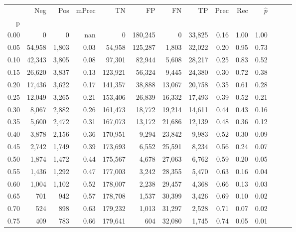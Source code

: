 \begin{tabular}{rrrrrrrrrrrrrr}
\toprule
{} &     Neg &    Pos & mPrec &       TN &       FP &      FN &      TP &  Prec &   Rec & $\hat{p}$ \\
p    &         &        &       &          &          &         &         &       &       &           \\
\midrule
0.00 &       0 &      0 &   nan &        0 &  180,245 &       0 &  33,825 &  0.16 &  1.00 &      1.00 \\
0.05 &  54,958 &  1,803 &  0.03 &   54,958 &  125,287 &   1,803 &  32,022 &  0.20 &  0.95 &      0.73 \\
0.10 &  42,343 &  3,805 &  0.08 &   97,301 &   82,944 &   5,608 &  28,217 &  0.25 &  0.83 &      0.52 \\
0.15 &  26,620 &  3,837 &  0.13 &  123,921 &   56,324 &   9,445 &  24,380 &  0.30 &  0.72 &      0.38 \\
0.20 &  17,436 &  3,622 &  0.17 &  141,357 &   38,888 &  13,067 &  20,758 &  0.35 &  0.61 &      0.28 \\
0.25 &  12,049 &  3,265 &  0.21 &  153,406 &   26,839 &  16,332 &  17,493 &  0.39 &  0.52 &      0.21 \\
0.30 &   8,067 &  2,882 &  0.26 &  161,473 &   18,772 &  19,214 &  14,611 &  0.44 &  0.43 &      0.16 \\
0.35 &   5,600 &  2,472 &  0.31 &  167,073 &   13,172 &  21,686 &  12,139 &  0.48 &  0.36 &      0.12 \\
0.40 &   3,878 &  2,156 &  0.36 &  170,951 &    9,294 &  23,842 &   9,983 &  0.52 &  0.30 &      0.09 \\
0.45 &   2,742 &  1,749 &  0.39 &  173,693 &    6,552 &  25,591 &   8,234 &  0.56 &  0.24 &      0.07 \\
0.50 &   1,874 &  1,472 &  0.44 &  175,567 &    4,678 &  27,063 &   6,762 &  0.59 &  0.20 &      0.05 \\
0.55 &   1,436 &  1,292 &  0.47 &  177,003 &    3,242 &  28,355 &   5,470 &  0.63 &  0.16 &      0.04 \\
0.60 &   1,004 &  1,102 &  0.52 &  178,007 &    2,238 &  29,457 &   4,368 &  0.66 &  0.13 &      0.03 \\
0.65 &     701 &    942 &  0.57 &  178,708 &    1,537 &  30,399 &   3,426 &  0.69 &  0.10 &      0.02 \\
0.70 &     524 &    898 &  0.63 &  179,232 &    1,013 &  31,297 &   2,528 &  0.71 &  0.07 &      0.02 \\
0.75 &     409 &    783 &  0.66 &  179,641 &      604 &  32,080 &   1,745 &  0.74 &  0.05 &      0.01 \\

\end{tabular}
